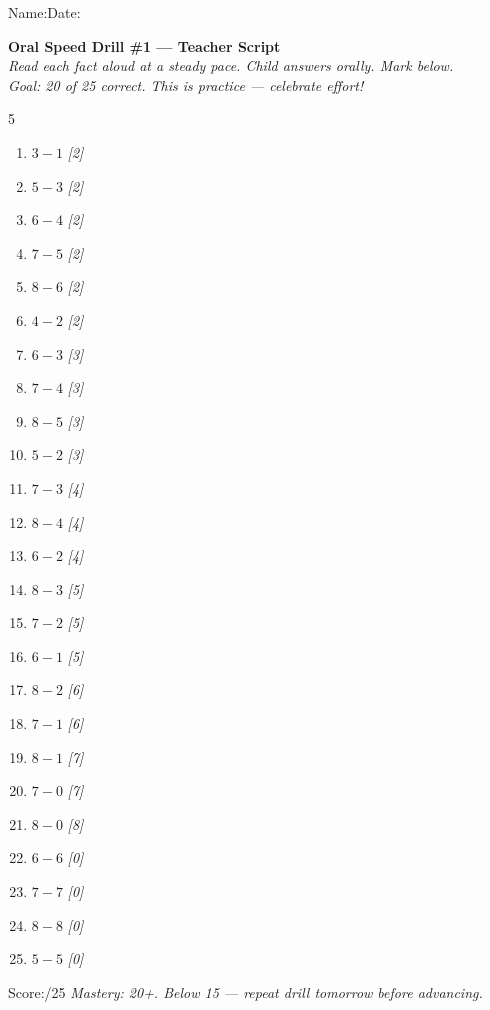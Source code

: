 \documentclass[12pt, letterpaper]{article}
\begin{document}

{\small Name:\ansblanklg \hfill Date:\ansblank}
\goldrule

\begin{mdframed}[backgroundcolor=sd-gold!15,linecolor=sd-gold,linewidth=1.5pt,roundcorner=4pt,
  innerleftmargin=10pt,innerrightmargin=10pt,innertopmargin=8pt,innerbottommargin=8pt]
\textbf{\color{sd-gold}Oral Speed Drill \#1 — Teacher Script}\\[4pt]
\textit{Read each fact aloud at a steady pace. Child answers orally. Mark below.}\\
\textit{Goal: 20 of 25 correct. This is practice — celebrate effort!}\\[6pt]
\begin{multicols}{5}
\begin{enumerate}[leftmargin=*,label=\small\arabic*.,itemsep=1pt]
  \item $3-1$ \textit{[2]}
  \item $5-3$ \textit{[2]}
  \item $6-4$ \textit{[2]}
  \item $7-5$ \textit{[2]}
  \item $8-6$ \textit{[2]}
  \item $4-2$ \textit{[2]}
  \item $6-3$ \textit{[3]}
  \item $7-4$ \textit{[3]}
  \item $8-5$ \textit{[3]}
  \item $5-2$ \textit{[3]}
  \item $7-3$ \textit{[4]}
  \item $8-4$ \textit{[4]}
  \item $6-2$ \textit{[4]}
  \item $8-3$ \textit{[5]}
  \item $7-2$ \textit{[5]}
  \item $6-1$ \textit{[5]}
  \item $8-2$ \textit{[6]}
  \item $7-1$ \textit{[6]}
  \item $8-1$ \textit{[7]}
  \item $7-0$ \textit{[7]}
  \item $8-0$ \textit{[8]}
  \item $6-6$ \textit{[0]}
  \item $7-7$ \textit{[0]}
  \item $8-8$ \textit{[0]}
  \item $5-5$ \textit{[0]}
\end{enumerate}
\end{multicols}
\noindent Score:\underline{\hspace{1.5cm}}/25\hfill
\textit{Mastery: 20+. Below 15 — repeat drill tomorrow before advancing.}
\end{mdframed}
\end{document}
